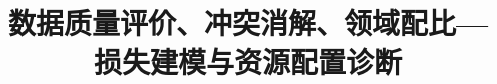 \documentclass[bwprint]{template/gmcmthesis}
\title{数据质量评价、冲突消解、领域配比—损失建模与资源配置诊断}
\begin{document}
\maketitle
\begin{abstract}

\end{abstract}
\pagestyle{plain}













\clearpage


\clearpage
\begin{appendices}

\end{appendices}
\end{document}
